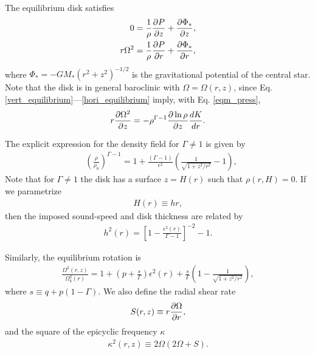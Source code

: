 The equilibrium disk satisfies
\begin{align}
  0 &= \frac{1}{\rho}\frac{\partial P}{\partial z} + \frac{\partial \Phi_*}{\partial z},\label{vert_equilibrium}\\
  r\Omega^2&= \frac{1}{\rho}\frac{\partial P}{\partial r} + \frac{\partial \Phi_*}{\partial
    r},\label{hori_equilibrium} 
\end{align} 
where $\Phi_* = -GM_*(r^2 + z^2)^{-1/2}$ is the gravitational
potential of the central star. Note that the disk is in general
baroclinic with $\Omega = \Omega(r,z)$, since
Eq. \ref{vert_equilibrium}---\ref{hori_equilibrium} imply, with
Eq. \ref{eqm_press},  
\begin{align}
  r\frac{\partial\Omega^2}{\partial z} = - \rho^{\Gamma-1}\frac{\partial\ln\rho}{\partial z}\frac{dK}{dr}.\label{vertical_shear}
\end{align}


The explicit expression for the density field for
$\Gamma\neq1$ is given  by
\begin{align}\label{eqm_dens}
  &\left(\frac{\rho}{\rho_0}\right)^{\Gamma-1} = 1 +
  \frac{\left(\Gamma-1\right)}{\epsilon^2}\left(\frac{1}{\sqrt{1+z^2/r^2}}-1\right),
\end{align}
Note that for $\Gamma\neq1$ the disk has a surface $z=H(r)$ such that
$\rho(r,H)=0$. If we parametrize
\begin{align}
  H(r)\equiv h r,
\end{align}
then the imposed sound-speed and disk thickness are related by 
\begin{align}
  h^2(r) = \left[1-\frac{\epsilon^2(r)}{\Gamma-1}\right]^{-2}-1. 
\end{align}

Similarly, the equilibrium rotation is 
\begin{align}\label{eqm_rot}
  \frac{\Omega^2(r,z)}{\Omega_k^2(r)}=1 +
  \left(p+\frac{s}{\Gamma}\right)\epsilon^2(r) 
  +\frac{s}{\Gamma} \left(1-\frac{1}{\sqrt{1+z^2/r^2}}\right), 
\end{align}
where $s\equiv q+p(1-\Gamma)$. We also define the radial shear rate  
\begin{align}
  S(r,z) \equiv r\frac{\partial\Omega}{\partial r},  
\end{align}
and the square of the epicyclic frequency $\kappa$ 
\begin{align}
  \kappa^2(r,z) \equiv 2\Omega(2\Omega + S). 
\end{align}


